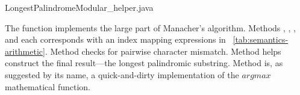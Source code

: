 
{LongestPalindromeModular_helper.java}

The  function implements the large part of Manacher's algorithm.
Methods , , , and 
each corresponds with an index mapping expressions in \mbox{~\autoref{tab:semantics-arithmetic}}.
Method  checks for pairwise character mismatch.
Method  helps construct the final result---the longest palindromic substring.
Method  is, as suggested by its name, a quick-and-dirty implementation of the $argmax$
mathematical function.
